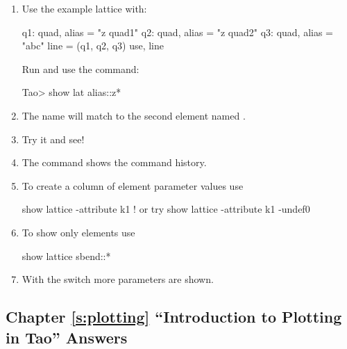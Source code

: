 \documentclass{hitec}     %
\begin{document}
\begin{enumerate}[label=\ref*{s:show}.\arabic{enumi}]
\item
Use the example lattice with:
\begin{code}
q1: quad, alias = "z quad1"
q2: quad, alias = "z quad2"
q3: quad, alias = "abc"
line = (q1, q2, q3)
use, line
\end{code}
Run \tao and use the command:
\begin{code}
Tao> show lat alias::z*
\end{code}
%
\item
The name  will match to the second element named .
%
\item
Try it and see!
%
\item
The  command shows the command history.
%
\item
To create a column of  element parameter values use
\begin{code}
show lattice -attribute k1           ! or try
show lattice -attribute k1 -undef0
\end{code}
%
\item
To show only  elements use
\begin{code}
show lattice sbend::*
\end{code}
%
\item
With the  switch more parameters are shown.
\end{enumerate}

\subsection[Chapter \ref*{s:plotting.ex} ``Introduction to Plotting in Tao'']{Chapter \hyperref[s:plotting.ex]{\ref*{s:plotting}} ``Introduction to Plotting in Tao'' Answers}
\label{s:ans.plot}
\end{document}
